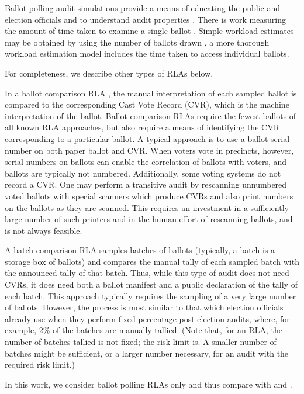 Ballot polling audit simulations provide a means of educating the public and election officials \cite{dice} and to understand audit properties \cite{mclaughlin_thesis,simulations_house, blom_IRV, DBLP:conf/evoteid/HuangRSTV20}. There is work measuring the amount of time taken to examine a single ballot \cite{RI-report}. 
Simple workload estimates may be obtained by using the number of ballots drawn \cite{bernoulli-ballot-polling}, a more thorough workload estimation model includes the time taken to access individual ballots\cite{bernhard-diss}. 

For completeness, we describe other types of RLAs below. 
\begin{description}
\item In a ballot comparison RLA \cite{RLA}, the manual interpretation of each sampled ballot is compared to the corresponding Cast Vote Record (CVR), which is the machine interpretation of the ballot. Ballot comparison RLAs require the fewest ballots of all known RLA approaches, but also require a means of identifying the CVR corresponding to a particular ballot. A typical approach is to use a ballot serial number on both paper ballot and CVR. When voters vote in precincts, however, serial numbers on ballots can enable the correlation of ballots with voters, and ballots are typically not numbered. Additionally, some voting systems do not record a CVR. One may perform a transitive audit by rescanning unnumbered voted ballots with special scanners which produce CVRs and also print numbers on the ballots as they are scanned. This requires an investment in a sufficiently large number of such printers and in the human effort of rescanning ballots, and is not always feasible. 
\item A batch comparison RLA \cite{RI-report} samples batches of ballots (typically, a batch is a storage box of ballots) and compares the manual tally of each sampled batch with the announced tally of that batch. Thus, while this type of audit does not need CVRs, it does need both a ballot manifest and a public declaration of the tally of each batch. This approach typically requires the sampling of a very large number of ballots. However, the process is most similar to that which election officials already use when they perform fixed-percentage post-election audits, where, for example, 2\% of the batches are manually tallied. (Note that, for an RLA, the number of batches tallied is not fixed; the risk limit is. A smaller number of batches might be sufficient, or a larger number necessary, for an audit with the required risk limit.)
\end{description}

In this work, we consider ballot polling RLAs only and thus compare \Providence with \BRAVO and \Minerva.

